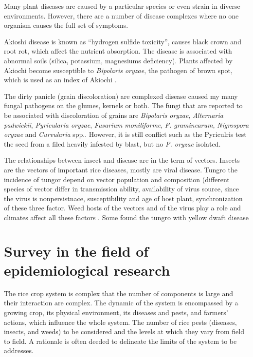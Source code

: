 \documentclass[12pt, oneside]{report}
\begin{document}
Many plant diseases are caused by a particular species or even strain in diverse environments. However, there are a number of disease complexes where no one organism causes the full set of symptoms.

Akioshi disease is known as ``hydrogen sulfide toxicity'', causes black crown and root rot, which affect the nutrient absorption. The disease is associated with abnormal soils (silica, potassium, magnesiums deficiency). Plants affected by Akiochi become susceptible to \textit{Bipolaris oryzae}, the pathogen of brown spot, which is used as an index of Akiochi \citep{ouricedisease}.


The dirty panicle (grain discoloration) are complexed disease caused my many fungal pathogens on the glumes, kernels or both. The fungi that are reported to be associated with discoloration of grains are \textit{Bipolaris oryzae}, \textit{Alternaria padwickii}, \textit{Pyricularia oryzae}, \textit{Fusarium moniliforme}, \textit{F. graminearum}, \textit{Nigrospora oryzae} and \textit{Curvularia} spp.\cite{ouricedisease}. However, it is still conflict such as the Pyriculris test the seed from a filed heavily infested by blast, but no \textit{P. oryzae} isolated.

The relationships between insect and disease are in the term of vectors. Insects are the vectors of important rice diseases, mostly are viral disease. Tungro the incidence of tungor depend on vector population and composition (different species of vector differ in transmission ability,  availability of virus source, since the virus is nonpersistnace, susceptibility and age of host plant, synchronization of these three factor. Weed hosts of the vectors and of the virus play a role and climates affect all these factors \cite{naganagoud2010studies}. Some found the tungro with yellow dwaft disease \cite{ouricedisease}

\section*{Survey in the field of epidemiological research}

The rice crop system is complex that the number of components is large and their interaction are complex. The dynamic of the system is encompassed by a growing crop, its physical environment, its diseases and pests, and farmers' actions, which influence the whole system. The number of rice pests (diseases, insects, and weeds) to be considered and the levels at which they vary from field to field. A rationale is often deeded to delineate the limits of the system to be addresses.
\end{document}
